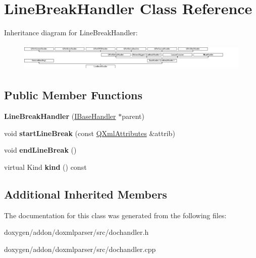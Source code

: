 \hypertarget{class_line_break_handler}{}\section{Line\+Break\+Handler Class Reference}
\label{class_line_break_handler}
Inheritance diagram for Line\+Break\+Handler\+:\begin{figure}[H]
\begin{center}
\leavevmode
\includegraphics[height=1.367521cm]{class_line_break_handler}
\end{center}
\end{figure}
\subsection*{Public Member Functions}
\begin{DoxyCompactItemize}
\item 
\mbox{\label{class_line_break_handler_a14fb5efb1d2f5dabc4f3ee4c74bb6fca}} 
{\bfseries Line\+Break\+Handler} (\mbox{\hyperlink{class_i_base_handler}{I\+Base\+Handler}} $\ast$parent)
\item 
\mbox{\label{class_line_break_handler_a7bda9a1bbf01582552fb573ff9b1a3d6}} 
void {\bfseries start\+Line\+Break} (const \mbox{\hyperlink{class_q_xml_attributes}{Q\+Xml\+Attributes}} \&attrib)
\item 
\mbox{\label{class_line_break_handler_a639205c91a39d76975ab28a533b3836e}} 
void {\bfseries end\+Line\+Break} ()
\item 
\mbox{\label{class_line_break_handler_ae8621c7cce6412d3c3758e5d3e1514b8}} 
virtual Kind {\bfseries kind} () const
\end{DoxyCompactItemize}
\subsection*{Additional Inherited Members}


The documentation for this class was generated from the following files\+:\begin{DoxyCompactItemize}
\item 
doxygen/addon/doxmlparser/src/dochandler.\+h\item 
doxygen/addon/doxmlparser/src/dochandler.\+cpp\end{DoxyCompactItemize}
